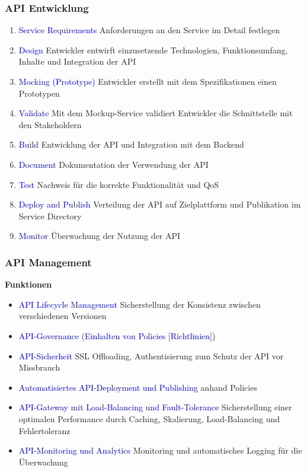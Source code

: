 \subsubsection{API Entwicklung}

\begin{enumerate}
    \item \textcolor{blue}{Service Requirements} Anforderungen an den Service im Detail festlegen
    \item \textcolor{blue}{Design} Entwickler entwirft einzusetzende Technologien, Funktionsumfang, Inhalte und Integration der API
    \item \textcolor{blue}{Mocking (Prototype)} Entwickler erstellt mit dem Spezifikationen einen Prototypen
    \item \textcolor{blue}{Validate} Mit dem Mockup-Service validiert Entwickler die Schnittstelle mit den Stakeholdern
    \item \textcolor{blue}{Build} Entwicklung der API und Integration mit dem Backend
    \item \textcolor{blue}{Document} Dokumentation der Verwendung der API
    \item \textcolor{blue}{Test} Nachweis für die korrekte Funktionalität und QoS
    \item \textcolor{blue}{Deploy and Publish} Verteilung der API auf Zielplattform und Publikation im Service Directory
    \item \textcolor{blue}{Monitor} Überwachung der Nutzung der API
\end{enumerate}

\subsubsection{API Management}

\textbf{Funktionen}

\begin{itemize}
    \item \textcolor{blue}{API Lifecycle Management} Sicherstellung der Konsistenz zwischen verschiedenen Versionen
    \item \textcolor{blue}{API-Governance (Einhalten von Policies [Richtlinien])}
    \item \textcolor{blue}{API-Sicherheit} SSL Offloading, Authentisierung zum Schutz der API vor Missbrauch
    \item \textcolor{blue}{Automatisiertes API-Deployment und Publishing} anhand Policies
    \item \textcolor{blue}{API-Gateway mit Load-Balancing und Fault-Tolerance} Sicherstellung einer optimalen Performance durch Caching, Skalierung, Load-Balancing und Fehlertoleranz
    \item \textcolor{blue}{API-Monitoring und Analytics} Monitoring und automatisches Logging für die Überwachung
\end{itemize}

